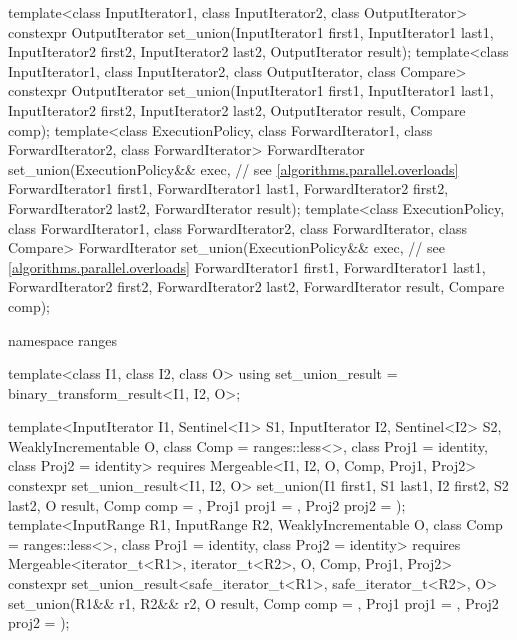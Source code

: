 \begin{codeblock}
{  template<class InputIterator1, class InputIterator2, class OutputIterator>
    constexpr OutputIterator
      set_union(InputIterator1 first1, InputIterator1 last1,
                InputIterator2 first2, InputIterator2 last2,
                OutputIterator result);
  template<class InputIterator1, class InputIterator2, class OutputIterator, class Compare>
    constexpr OutputIterator
                set_union(InputIterator1 first1, InputIterator1 last1,
                InputIterator2 first2, InputIterator2 last2,
                OutputIterator result, Compare comp);
  template<class ExecutionPolicy, class ForwardIterator1, class ForwardIterator2,
           class ForwardIterator>
    ForwardIterator
      set_union(ExecutionPolicy&& exec, // see \ref{algorithms.parallel.overloads}
                ForwardIterator1 first1, ForwardIterator1 last1,
                ForwardIterator2 first2, ForwardIterator2 last2,
                ForwardIterator result);
  template<class ExecutionPolicy, class ForwardIterator1, class ForwardIterator2,
           class ForwardIterator, class Compare>
    ForwardIterator
      set_union(ExecutionPolicy&& exec, // see \ref{algorithms.parallel.overloads}
                ForwardIterator1 first1, ForwardIterator1 last1,
                ForwardIterator2 first2, ForwardIterator2 last2,
                ForwardIterator result, Compare comp);

  namespace ranges {
    template<class I1, class I2, class O>
    using set_union_result = binary_transform_result<I1, I2, O>;

    template<InputIterator I1, Sentinel<I1> S1, InputIterator I2, Sentinel<I2> S2,
             WeaklyIncrementable O, class Comp = ranges::less<>,
             class Proj1 = identity, class Proj2 = identity>
      requires Mergeable<I1, I2, O, Comp, Proj1, Proj2>
      constexpr set_union_result<I1, I2, O>
        set_union(I1 first1, S1 last1, I2 first2, S2 last2, O result, Comp comp = {},
                  Proj1 proj1 = {}, Proj2 proj2 = {});
    template<InputRange R1, InputRange R2, WeaklyIncrementable O,
             class Comp = ranges::less<>, class Proj1 = identity, class Proj2 = identity>
      requires Mergeable<iterator_t<R1>, iterator_t<R2>, O, Comp, Proj1, Proj2>
      constexpr set_union_result<safe_iterator_t<R1>, safe_iterator_t<R2>, O>
        set_union(R1&& r1, R2&& r2, O result, Comp comp = {},
                  Proj1 proj1 = {}, Proj2 proj2 = {});
  }

}
\end{codeblock}
